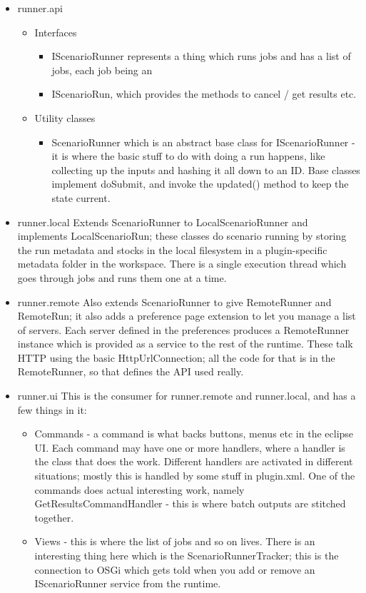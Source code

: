 \documentclass[11pt]{article}
\begin{document}
\begin{itemize}
\item runner.api
\begin{itemize}
\item Interfaces
\begin{itemize}
\item IScenarioRunner represents a thing which runs jobs and has a list of jobs, each job being an
\item IScenarioRun, which provides the methods to cancel / get results etc.
\end{itemize}
\item Utility classes
\begin{itemize}
\item ScenarioRunner which is an abstract base class for IScenarioRunner - it is where the basic stuff to do with doing a run happens, like collecting up the inputs and hashing it all down to an ID. Base classes implement doSubmit, and invoke the updated() method to keep the state current.
\end{itemize}
\end{itemize}
\item runner.local
Extends ScenarioRunner to LocalScenarioRunner and implements LocalScenarioRun; these classes do scenario running by storing the run metadata and stocks in the local filesystem in a plugin-specific metadata folder in the workspace. There is a single execution thread which goes through jobs and runs them one at a time.
\item runner.remote
Also extends ScenarioRunner to give RemoteRunner and RemoteRun; it also adds a preference page extension to let you manage a list of servers. Each server defined in the preferences produces a RemoteRunner instance which is provided as a service to the rest of the runtime. These talk HTTP using the basic HttpUrlConnection; all the code for that is in the RemoteRunner, so that defines the API used really.
\item runner.ui
This is the consumer for runner.remote and runner.local, and has a few things in it:
\begin{itemize}
\item Commands - a command is what backs buttons, menus etc in the eclipse UI. Each command may have one or more handlers, where a handler is the class that does the work. Different handlers are activated in different situations; mostly this is handled by some stuff in plugin.xml. One of the commands does actual interesting work, namely GetResultsCommandHandler - this is where batch outputs are stitched together.
\item Views - this is where the list of jobs and so on lives. There is an interesting thing here which is the ScenarioRunnerTracker; this is the connection to OSGi which gets told when you add or remove an IScenarioRunner service from the runtime.
\end{itemize}
\end{itemize}
\end{document}
